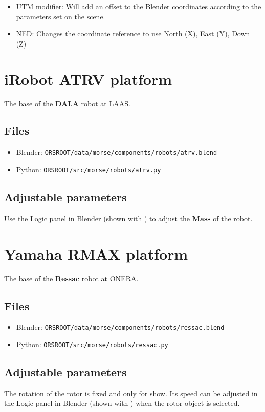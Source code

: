 \documentclass[twoside,a4paper,10pt]{report}
\newcommand{\key}[1]{\fcolorbox{Dark}{Light}{\textbf{#1}}}
\newcommand{\dokutitlelevelone}[1]{\chapter{#1}}
\newcommand{\dokutitleleveltwo}[1]{\section{#1}}
\newcommand{\dokubold}[1]{\textbf{#1}}
\newcommand{\dokumonospace}[1]{\texttt{#1}}
\newcommand{\dokuitem}{\item}
\begin{document}
\begin{itemize}
\dokuitem  UTM modifier: Will add an offset to the Blender coordinates according to the parameters set on the scene.
\end{itemize}

\begin{itemize}
\dokuitem  NED: Changes the coordinate reference to use North (X), East (Y), Down (Z)
\end{itemize}

\dokutitlelevelone{iRobot ATRV platform}
\label{51f82c2a17c65a05f749f4b5d80a19b3}%
\label{4fd87f5742582d412dce2c6ad5304937}%

The base of the \dokubold{DALA} robot at LAAS.


\dokutitleleveltwo{Files}
\label{45b963397aa40d4a0063e0d85e4fe7a1}%

\begin{itemize}
\dokuitem  Blender: \dokumonospace{{\textdollar}ORS{\textunderscore}ROOT/data/morse/components/robots/atrv.blend}
\dokuitem  Python: \dokumonospace{{\textdollar}ORS{\textunderscore}ROOT/src/morse/robots/atrv.py}
\end{itemize}

\dokutitleleveltwo{Adjustable parameters}
\label{4997feebf90104aab2d79756367e9b42}%

Use the Logic panel in Blender (shown with \key{F4}) to adjust the \dokubold{Mass} of the robot.


\dokutitlelevelone{Yamaha RMAX platform}
\label{997ffd08d6757c595f9c1d4ef5679d13}%
\label{311954cf2f831f2289fb7fff75d15a7d}%

The base of the \dokubold{Ressac} robot at ONERA.


\dokutitleleveltwo{Files}
\label{45b963397aa40d4a0063e0d85e4fe7a1}%

\begin{itemize}
\dokuitem  Blender: \dokumonospace{{\textdollar}ORS{\textunderscore}ROOT/data/morse/components/robots/ressac.blend}
\dokuitem  Python: \dokumonospace{{\textdollar}ORS{\textunderscore}ROOT/src/morse/robots/ressac.py}
\end{itemize}

\dokutitleleveltwo{Adjustable parameters}
\label{4997feebf90104aab2d79756367e9b42}%

The rotation of the rotor is fixed and only for show. Its speed can be adjusted in the Logic panel in Blender (shown with \key{F4}) when the rotor object is selected.
\end{document}
